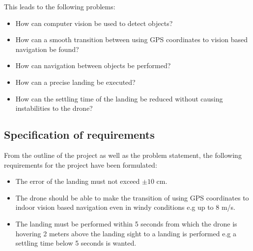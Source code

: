 \documentclass[../Head/Report.tex]{subfiles}
\begin{document}
This leads to the following problems:

\begin{itemize}
    \item How can computer vision be used to detect objects?
    \item How can a smooth transition between using GPS coordinates to vision based navigation be found?
    \item How can navigation between objects be performed?
    \item How can a precise landing be executed?
    \item How can the settling time of the landing be reduced without causing instabilities to the drone?
    
\end{itemize} 

\subsection{Specification of requirements}

From the outline of the project as well as the problem statement, the following requirements for the project have been formulated:

\begin{itemize}
    \item The error of the landing must not exceed $\pm 10$ cm. 
    \item The drone should be able to make the transition of using GPS coordinates to indoor vision based navigation even in windy conditions e.g up to 8 m/s.
    \item The landing must be performed within 5 seconds from which the drone is hovering 2 meters above the landing sight to a landing is performed e.g a settling time below 5 seconds is wanted.   

\end{itemize}
\end{document}
